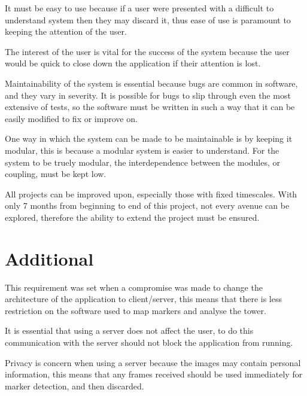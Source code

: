 \begin{enumerate}
It must be easy to use because if a user were presented with a difficult to understand system then they may discard it, thus ease of use is paramount to keeping the attention of the user.

The interest of the user is vital for the success of the system because the user would be quick to close down the application if their attention is lost.

Maintainability of the system is essential because bugs are common in software, and they vary in severity. It is possible for bugs to slip through even the most extensive of tests, so the software must be written in such a way that it can be easily modified to fix or improve on.

One way in which the system can be made to be maintainable is by keeping it modular, this is because a modular system is easier to understand. For the system to be truely modular, the interdependence between the modules, or coupling, must be kept low.

All projects can be improved upon, especially those with fixed timescales. With only 7 months from beginning to end of this project, not every avenue can be explored, therefore the ability to extend the project must be ensured.

\section{Additional}\label{sec:req:additional}

This requirement was set when a compromise was made to change the architecture of the application to client/server, this means that there is less restriction on the software used to map markers and analyse the tower.

It is essential that using a server does not affect the user, to do this communication with the server should not block the application from running.

Privacy is concern when using a server because the images may contain personal information, this means that any frames received should be used immediately for marker detection, and then discarded.



\end{enumerate}